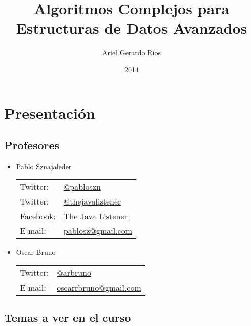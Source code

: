 \documentclass[a4paper]{report}
\begin{document}
    \title{Algoritmos Complejos para Estructuras de Datos Avanzados}
    \author{Ariel Gerardo Ríos}
    \date{2014}
    \maketitle

    \tableofcontents

    \chapter{Presentación}

        \section{Profesores}

            \begin{itemize}
                \item Pablo Sznajaleder
                    \begin{tabular}{l@{\thinspace}l}
                        Twitter:    &\href{https://twitter.com/pabloszn}{@pabloszn}\\
                        Twitter:    &\href{https://twitter.com/thejavalistener}{@thejavalistener}\\
                        Facebook:   &\href{https://www.facebook.com/thejavalistener}{The Java Listener}\\
                        E-mail:     &\href{mailto:pablosz@gmail.com}{pablosz@gmail.com}
                    \end{tabular}

                \item Oscar Bruno
                    \begin{tabular}{l@{\thinspace}l}
                        Twitter:    &\href{https://twitter.com/arbruno}{@arbruno}\\
                        E-mail:     &\href{mailto:oscarrbruno@gmail.com}{oscarrbruno@gmail.com}
                    \end{tabular}
            \end{itemize}

        \section{Temas a ver en el curso}
\end{document}
